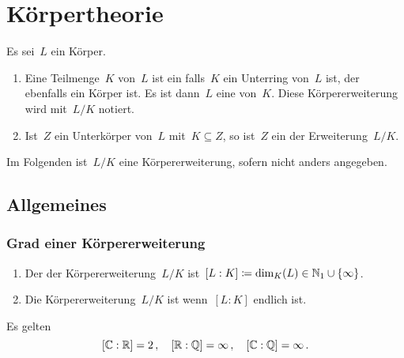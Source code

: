 \chapter{Körpertheorie}

\begin{definition}
  Es sei~$L$ ein Körper.
  \begin{enumerate}
    \item
      Eine Teilmenge~$K$ von~$L$ ist ein  falls~$K$ ein Unterring von~$L$ ist, der ebenfalls ein Körper ist.
      Es ist dann~$L$ eine  von~$K$.
      Diese Körpererweiterung wird mit~$L/K$ notiert.
    \item
      Ist~$Z$ ein Unterkörper von~$L$ mit~$K \subseteq Z$, so ist~$Z$ ein  der Erweiterung~$L/K$.
  \end{enumerate}
\end{definition}

\begin{convention}
  Im Folgenden ist~$L/K$ eine Körpererweiterung, sofern nicht anders angegeben.
\end{convention}





\section{Allgemeines}



\subsection{Grad einer Körpererweiterung}

\begin{definition}
  \leavevmode
  \begin{enumerate}
    \item
      Der  der Körpererweiterung~$L/K$ ist~$[L : K] \coloneqq \dim_K(L) \in \mathbb{N}_1 \cup \{ \infty \}$.
    \item
      Die Körpererweiterung~$L/K$ ist  wenn~$[L : K]$ endlich ist.
  \end{enumerate}
\end{definition}

\begin{example}
  Es gelten
  \[
    [\mathbb{C} : \mathbb{R}] = 2 \,,
    \quad
    [\mathbb{R} : \mathbb{Q}] = \infty \,,
    \quad
    [\mathbb{C} : \mathbb{Q}] = \infty \,.
  \]
\end{example}

